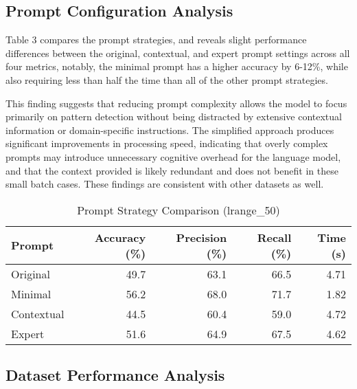 \documentclass[sigconf,authorversion,nonacm]{acmart}
\begin{document}
\subsection{Prompt Configuration Analysis}


Table 3 compares the prompt strategies, and reveals slight performance differences between the original, contextual, and expert prompt settings across all four metrics, notably, the minimal prompt has a higher accuracy by 6-12\%, while also requiring less than half the time than all of the other prompt strategies. 

This finding suggests that reducing prompt complexity allows the model to focus primarily on pattern detection without being distracted by extensive contextual information or domain-specific instructions. The simplified approach produces significant improvements in processing speed, indicating that overly complex prompts may introduce unnecessary cognitive overhead for the language model, and that the context provided is likely redundant and does not benefit in these small batch cases. These findings are consistent with other datasets as well. 

\begin{table}[!htbp]
\centering
\caption{Prompt Strategy Comparison (lrange\_50)}
\small
\label{tab:prompt-strategy-comparison}
\begin{tabular}{@{}lrrrr@{}}
\toprule
\textbf{Prompt} & \textbf{Accuracy (\%)} & \textbf{Precision (\%)} & \textbf{Recall (\%)} & \textbf{Time (s)} \\
\midrule
Original & 49.7 & 63.1 & 66.5 & 4.71 \\
Minimal & 56.2 & 68.0 & 71.7 & 1.82 \\
Contextual & 44.5 & 60.4 & 59.0 & 4.72 \\
Expert & 51.6 & 64.9 & 67.5 & 4.62 \\
\bottomrule
\end{tabular}
\end{table}


\subsection{Dataset Performance Analysis}
\end{document}
